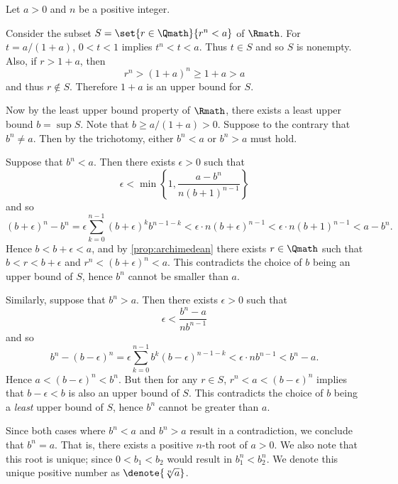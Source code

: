 \begin{example}
    \label{exm:nthroot}
    Let \(a>0\) and \(n\) be a positive integer.
    
    Consider the subset \(S=\set{r\in\Qmath}{r^n<a}\) of \(\Rmath\).
    For \(t=a/(1+a)\), \(0<t<1\) implies \(t^n<t<a\).
    Thus \(t\in S\) and so \(S\) is nonempty.
    Also, if \(r>1+a\),
    then
    \[
        r^n>(1+a)^n\ge 1+a>a
    \]
    and thus \(r\notin S\).
    Therefore \(1+a\) is an upper bound for \(S\).

    Now by the least upper bound property of \(\Rmath\),
    there exists a least upper bound \(b=\sup S\).
    Note that \(b\ge a/(1+a)>0\).
    Suppose to the contrary that
    \(b^n\neq a\).
    Then by the trichotomy, either \(b^n<a\) or \(b^n>a\) must hold.

    Suppose that \(b^n<a\).
    Then there exists \(\epsilon>0\) such that
    \[
        \epsilon<\min\left\{1,\frac{a-b^n}{n(b+1)^{n-1}}\right\}
    \]
    and so
    \[
        (b+\epsilon)^n-b^n
        =\epsilon\sum_{k=0}^{n-1}(b+\epsilon)^kb^{n-1-k}
        <\epsilon\cdot n(b+\epsilon)^{n-1}
        <\epsilon\cdot n(b+1)^{n-1}
        <a-b^n.
    \]
    Hence \(b<b+\epsilon<a\),
    and by \cref{prop:archimedean}
    there exists \(r\in\Qmath\) such that
    \(b<r<b+\epsilon\) and \(r^n<(b+\epsilon)^n<a\).
    This contradicts the choice of \(b\) being an upper bound of \(S\),
    hence \(b^n\) cannot be smaller than \(a\).

    Similarly, suppose that \(b^n>a\).
    Then there exists \(\epsilon>0\) such that
    \[
        \epsilon<\frac{b^n-a}{nb^{n-1}}
    \]
    and so
    \[
        b^n-(b-\epsilon)^n
        =\epsilon\sum_{k=0}^{n-1}b^k(b-\epsilon)^{n-1-k}
        <\epsilon\cdot nb^{n-1}
        <b^n-a.
    \]
    Hence \(a<(b-\epsilon)^n<b^n\).
    But then for any \(r\in S\),
    \(r^n<a<(b-\epsilon)^n\) implies that
    \(b-\epsilon<b\) is also an upper bound of \(S\).
    This contradicts the choice of \(b\)
    being a \emph{least} upper bound of \(S\),
    hence \(b^n\) cannot be greater than \(a\).

    Since both cases where \(b^n<a\) and \(b^n>a\)
    result in a contradiction,
    we conclude that \(b^n=a\).
    That is,
    there exists a positive \(n\)-th root of \(a>0\).
    We also note that this root is unique;
    since \(0<b_1<b_2\) would result in \(b_1^n<b_2^n\).
    We denote this unique positive number as \(\denote{\sqrt[n]{a}}\).
\end{example}

